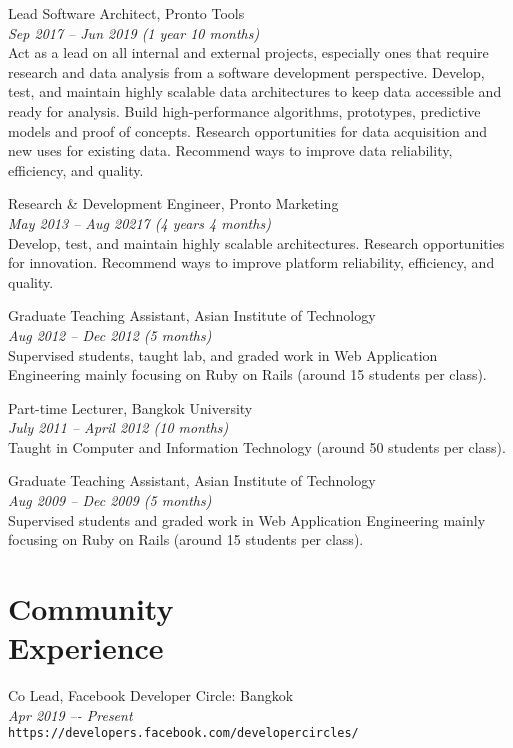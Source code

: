 \documentclass[margin, 10pt]{res}
\begin{document}
\begin{resume}
Lead Software Architect, Pronto Tools\\
{\it \small Sep 2017 -- Jun 2019 (1 year 10 months)}\\
Act as a lead on all internal and external projects, especially ones that
require research and data analysis from a software development perspective.
Develop, test, and maintain highly scalable data architectures to keep data
accessible and ready for analysis. Build high-performance algorithms,
prototypes, predictive models and proof of concepts. Research opportunities
for data acquisition and new uses for existing data. Recommend ways to
improve data reliability, efficiency, and quality.

Research \& Development Engineer, Pronto Marketing\\
{\it \small May 2013 -- Aug 20217 (4 years 4 months)}\\
Develop, test, and maintain highly scalable architectures.
Research opportunities for innovation. Recommend ways to improve
platform reliability, efficiency, and quality.

Graduate Teaching Assistant, Asian Institute of Technology\\
{\it \small Aug 2012 -- Dec 2012 (5 months)}\\
Supervised students, taught lab, and graded work in Web Application Engineering
mainly focusing on Ruby on Rails (around 15 students per class).

Part-time Lecturer, Bangkok University\\
{\it \small July 2011 -- April 2012 (10 months)}\\
Taught in Computer and Information Technology (around 50 students per class).

Graduate Teaching Assistant, Asian Institute of Technology\\
{\it \small Aug 2009 -- Dec 2009 (5 months)}\\
Supervised students and graded work in Web Application Engineering mainly focusing
on Ruby on Rails (around 15 students per class).

\section{Community \\ Experience}

Co Lead, Facebook Developer Circle: Bangkok\\
{\it \small Apr 2019 –- Present}\\
{\tt https://developers.facebook.com/developercircles/}


\end{resume}
\end{document}
